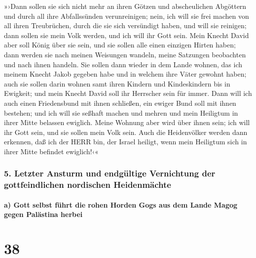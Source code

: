 »›Dann sollen sie sich nicht mehr an ihren Götzen und
abscheulichen Abgöttern und durch all ihre Abfallssünden verunreinigen;
nein, ich will sie frei machen von all ihren Treubrüchen, durch die sie
sich versündigt haben, und will sie reinigen; dann sollen sie mein Volk
werden, und ich will ihr Gott sein. Mein Knecht David
aber soll König über sie sein, und sie sollen alle einen einzigen Hirten
haben; dann werden sie nach meinen Weisungen wandeln, meine Satzungen
beobachten und nach ihnen handeln. Sie sollen dann wieder
in dem Lande wohnen, das ich meinem Knecht Jakob gegeben habe und in
welchem ihre Väter gewohnt haben; auch sie sollen darin wohnen samt
ihren Kindern und Kindeskindern bis in Ewigkeit; und mein Knecht David
soll ihr Herrscher sein für immer. Dann will ich auch
einen Friedensbund mit ihnen schließen, ein ewiger Bund soll mit ihnen
bestehen; und ich will sie seßhaft machen und mehren und mein Heiligtum
in ihrer Mitte belassen ewiglich. Meine Wohnung aber wird
über ihnen sein; ich will ihr Gott sein, und sie sollen mein Volk sein.
Auch die Heidenvölker werden dann erkennen, daß ich der
HERR bin, der Israel heiligt, wenn mein Heiligtum sich in ihrer Mitte
befindet ewiglich!‹«

\hypertarget{letzter-ansturm-und-endguxfcltige-vernichtung-der-gottfeindlichen-nordischen-heidenmuxe4chte}{%
\subsubsection{5. Letzter Ansturm und endgültige Vernichtung der
gottfeindlichen nordischen
Heidenmächte}\label{letzter-ansturm-und-endguxfcltige-vernichtung-der-gottfeindlichen-nordischen-heidenmuxe4chte}}

\hypertarget{a-gott-selbst-fuxfchrt-die-rohen-horden-gogs-aus-dem-lande-magog-gegen-paluxe4stina-herbei}{%
\paragraph{a) Gott selbst führt die rohen Horden Gogs aus dem Lande
Magog gegen Palästina
herbei}\label{a-gott-selbst-fuxfchrt-die-rohen-horden-gogs-aus-dem-lande-magog-gegen-paluxe4stina-herbei}}

\hypertarget{section-37}{%
\section{38}\label{section-37}}

